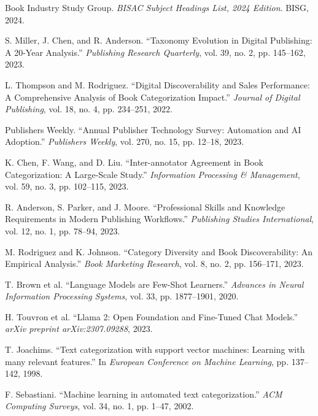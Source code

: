 \documentclass{article}
\begin{document}
\begin{thebibliography}{99}

Book Industry Study Group.
\textit{BISAC Subject Headings List, 2024 Edition}.
BISG, 2024.

S. Miller, J. Chen, and R. Anderson.
``Taxonomy Evolution in Digital Publishing: A 20-Year Analysis.''
\textit{Publishing Research Quarterly}, vol. 39, no. 2, pp. 145--162, 2023.

L. Thompson and M. Rodriguez.
``Digital Discoverability and Sales Performance: A Comprehensive Analysis of Book Categorization Impact.''
\textit{Journal of Digital Publishing}, vol. 18, no. 4, pp. 234--251, 2022.

Publishers Weekly.
``Annual Publisher Technology Survey: Automation and AI Adoption.''
\textit{Publishers Weekly}, vol. 270, no. 15, pp. 12--18, 2023.

K. Chen, F. Wang, and D. Liu.
``Inter-annotator Agreement in Book Categorization: A Large-Scale Study.''
\textit{Information Processing \& Management}, vol. 59, no. 3, pp. 102--115, 2023.

R. Anderson, S. Parker, and J. Moore.
``Professional Skills and Knowledge Requirements in Modern Publishing Workflows.''
\textit{Publishing Studies International}, vol. 12, no. 1, pp. 78--94, 2023.

M. Rodriguez and K. Johnson.
``Category Diversity and Book Discoverability: An Empirical Analysis.''
\textit{Book Marketing Research}, vol. 8, no. 2, pp. 156--171, 2023.

T. Brown et al.
``Language Models are Few-Shot Learners.''
\textit{Advances in Neural Information Processing Systems}, vol. 33, pp. 1877--1901, 2020.

H. Touvron et al.
``Llama 2: Open Foundation and Fine-Tuned Chat Models.''
\textit{arXiv preprint arXiv:2307.09288}, 2023.

T. Joachims.
``Text categorization with support vector machines: Learning with many relevant features.''
In \textit{European Conference on Machine Learning}, pp. 137--142, 1998.

F. Sebastiani.
``Machine learning in automated text categorization.''
\textit{ACM Computing Surveys}, vol. 34, no. 1, pp. 1--47, 2002.


\end{thebibliography}
\end{document}
